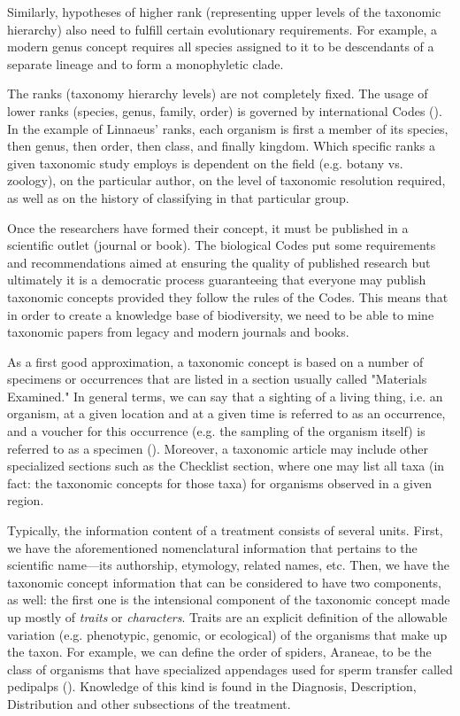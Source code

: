 Similarly, hypotheses of higher rank (representing upper levels of the taxonomic hierarchy) also need to fulfill certain evolutionary requirements. For example, a modern genus concept requires all species assigned to it to be descendants of a separate lineage and to form a monophyletic clade.

The ranks (taxonomy hierarchy levels) are not completely fixed. The usage of lower ranks (species, genus, family, order) is governed by international Codes (\cite{international_commission_on_zoological_nomenclature_international_1999,mcneill_international_2012}). In the example of Linnaeus' ranks, each organism is first a member of its species, then genus, then order, then class, and finally kingdom. Which specific ranks a given taxonomic study employs is dependent on the field (e.g. botany vs. zoology), on the particular author, on the level of taxonomic resolution required, as well as on the history of classifying in that particular group.

Once the researchers have formed their concept, it must be published in a scientific outlet (journal or book). The biological Codes put some requirements and recommendations aimed at ensuring the quality of published research but ultimately it is a democratic process guaranteeing that everyone may publish taxonomic concepts provided they follow the rules of the Codes. This means that in order to create a knowledge base of biodiversity, we need to be able to mine taxonomic papers from legacy and modern journals and books.

As a first good approximation, a taxonomic concept is based on a number of specimens or occurrences that are listed in a section usually called "Materials Examined." In general terms, we can say that a sighting of a living thing, i.e. an organism, at a given location and at a given time is referred to as an occurrence, and a voucher for this occurrence (e.g. the sampling of the organism itself) is referred to as a specimen (\cite{baskauf_darwin-sw:_2016}). Moreover, a taxonomic article may include other specialized sections such as the Checklist section, where one may list all taxa (in fact: the taxonomic concepts for those taxa) for organisms observed in a given region.

Typically, the information content of a treatment consists of several units. First, we have the aforementioned nomenclatural information that pertains to the scientific name---its authorship, etymology, related names, etc. Then, we have the taxonomic concept information that can be considered to have two components, as well: the first one is the intensional component of the taxonomic concept made up mostly of \emph{traits} or \emph{characters}. Traits are an explicit definition of the allowable variation (e.g. phenotypic, genomic, or ecological) of the organisms that make up the taxon. For example, we can define the order of spiders, Araneae, to be the class of organisms that have specialized appendages used for sperm transfer called pedipalps (\cite{platnick_cladograms_2001}). Knowledge of this kind is found in the Diagnosis, Description, Distribution and other subsections of the treatment.

